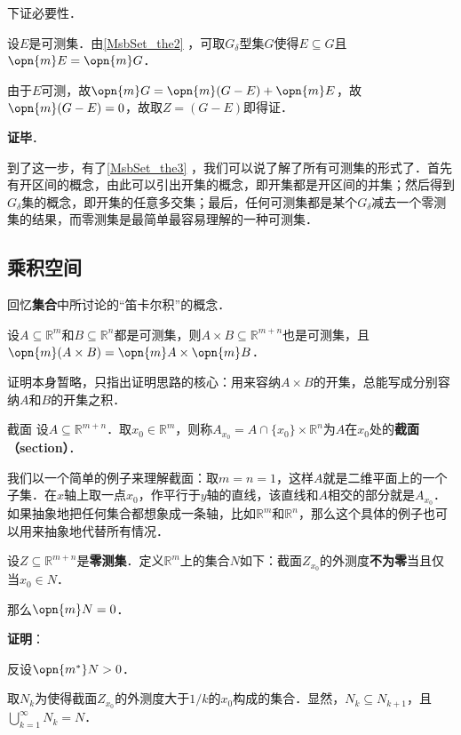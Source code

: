 下证必要性．

设$E$是可测集．由\autoref{MsbSet_the2} ，可取$G_\delta$型集$G$使得$E\subseteq G$且$\opn{m}E=\opn{m}G$．

由于$E$可测，故$\opn{m}G=\opn{m}(G-E)+\opn{m}E$，故$\opn{m}(G-E)=0$，故取$Z=(G-E)$即得证．

\textbf{证毕}．

到了这一步，有了\autoref{MsbSet_the3} ，我们可以说了解了所有可测集的形式了．首先有开区间的概念，由此可以引出开集的概念，即开集都是开区间的并集；然后得到$G_\delta$集的概念，即开集的任意多交集；最后，任何可测集都是某个$G_\delta$减去一个零测集的结果，而零测集是最简单最容易理解的一种可测集．


\subsection{乘积空间}

回忆\textbf{集合}中所讨论的“笛卡尔积”的概念．

\begin{theorem}{}
设$A\subseteq\mathbb{R}^m$和$B\subseteq\mathbb{R}^n$都是可测集，则$A\times B \subseteq \mathbb{R}^{m+n}$也是可测集，且$\opn{m}(A\times B)=\opn{m}A\times \opn{m}B$．
\end{theorem}

证明本身暂略，只指出证明思路的核心：用来容纳$A\times B$的开集，总能写成分别容纳$A$和$B$的开集之积．

\begin{definition}{截面}
设$A\subseteq\mathbb{R}^{m+n}$．取$x_0\in \mathbb{R}^m$，则称$A_{x_0}=A\cap \{x_0\}\times \mathbb{R}^n$为$A$在$x_0$处的\textbf{截面（section）}．
\end{definition}

我们以一个简单的例子来理解截面：取$m=n=1$，这样$A$就是二维平面上的一个子集．在$x$轴上取一点$x_0$，作平行于$y$轴的直线，该直线和$A$相交的部分就是$A_{x_0}$．如果抽象地把任何集合都想象成一条轴，比如$\mathbb{R}^m$和$\mathbb{R}^n$，那么这个具体的例子也可以用来抽象地代替所有情况．

\begin{theorem}{}
设$Z\subseteq \mathbb{R}^{m+n}$是\textbf{零测集}．定义$\mathbb{R}^m$上的集合$N$如下：截面$Z_{x_0}$的外测度\textbf{不为零}当且仅当$x_0\in N$．

那么$\opn{m}N=0$．
\end{theorem}

\textbf{证明}：

反设$\opn{m^*}N>0$．

取$N_k$为使得截面$Z_{x_0}$的外测度大于$1/k$的$x_0$构成的集合．显然，$N_k\subseteq N_{k+1}$，且$\bigcup_{k=1}^\infty N_k=N$．

